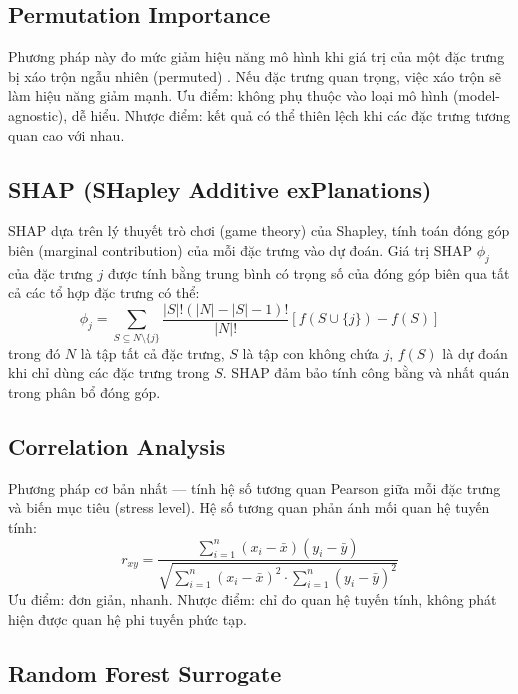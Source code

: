 \subsection{Permutation Importance}

Phương pháp này đo mức giảm hiệu năng mô hình khi giá trị của một đặc trưng bị xáo trộn ngẫu nhiên (permuted) \cite{fisher2019permutation}. Nếu đặc trưng quan trọng, việc xáo trộn sẽ làm hiệu năng giảm mạnh. Ưu điểm: không phụ thuộc vào loại mô hình (model-agnostic), dễ hiểu. Nhược điểm: kết quả có thể thiên lệch khi các đặc trưng tương quan cao với nhau.

\subsection{SHAP (SHapley Additive exPlanations)}

SHAP \cite{lundberg2017shap} dựa trên lý thuyết trò chơi (game theory) của Shapley, tính toán đóng góp biên (marginal contribution) của mỗi đặc trưng vào dự đoán. Giá trị SHAP $\phi_j$ của đặc trưng $j$ được tính bằng trung bình có trọng số của đóng góp biên qua tất cả các tổ hợp đặc trưng có thể:
\begin{equation}
    \phi_j = \sum_{S \subseteq N \setminus \{j\}} \frac{|S|!(|N|-|S|-1)!}{|N|!} [f(S \cup \{j\}) - f(S)]
\end{equation}
trong đó $N$ là tập tất cả đặc trưng, $S$ là tập con không chứa $j$, $f(S)$ là dự đoán khi chỉ dùng các đặc trưng trong $S$. SHAP đảm bảo tính công bằng và nhất quán trong phân bổ đóng góp.

\subsection{Correlation Analysis}

Phương pháp cơ bản nhất — tính hệ số tương quan Pearson giữa mỗi đặc trưng và biến mục tiêu (stress level). Hệ số tương quan phản ánh mối quan hệ tuyến tính:
\begin{equation}
    r_{xy} = \frac{\sum_{i=1}^{n}(x_i - \bar{x})(y_i - \bar{y})}{\sqrt{\sum_{i=1}^{n}(x_i - \bar{x})^2 \cdot \sum_{i=1}^{n}(y_i - \bar{y})^2}}
\end{equation}
Ưu điểm: đơn giản, nhanh. Nhược điểm: chỉ đo quan hệ tuyến tính, không phát hiện được quan hệ phi tuyến phức tạp.

\subsection{Random Forest Surrogate}

